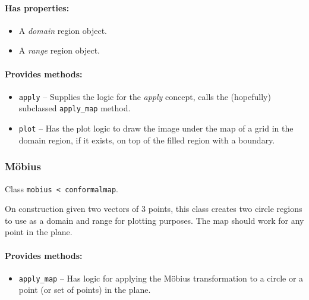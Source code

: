 \documentclass{article}
\newcommand{\code}[1]{\texttt{#1}}
\begin{document}
\paragraph{Has properties:}
\begin{itemize}
  \item A \emph{domain} region object.
  \item A \emph{range} region object.
\end{itemize}

\paragraph{Provides methods:}
\begin{itemize}
  \item \code{apply} -- Supplies the logic for the \emph{apply} concept, calls the (hopefully) subclassed \code{apply\_map} method.
  \item \code{plot} -- Has the plot logic to draw the image under the map of a grid in the domain region, if it exists, on top of the filled region with a boundary.
\end{itemize}

\subsubsection{M\"obius}
Class \code{mobius < conformalmap}.

On construction given two vectors of 3 points, this class creates two circle regions to use as a domain and range for plotting purposes. The map should work for any point in the plane.

\paragraph{Provides methods:}
\begin{itemize}
  \item \code{apply\_map} -- Has logic for applying the M\"obius transformation to a circle or a point (or set of points) in the plane.
\end{itemize}
\end{document}
